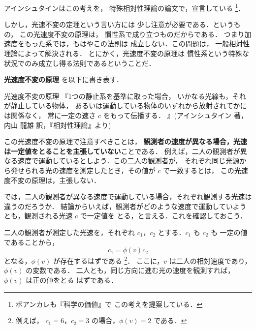             アインシュタインはこの考えを，
            特殊相対性理論の論文で，宣言している
                \footnote{
                    ポアンカレも『科学の価値』で
                    この考えを提案している．
                }．

            しかし，光速不変の定理という言い方には
            少し注意が必要である．というもの，
            この光速度不変の原理は，
            慣性系で成り立つものだからである．
            つまり加速度をもった系では，もはやこの法則は
            成立しない．この問題は，
            一般相対性理論によって解決される．
            とにかく，光速度不変の原理は
            慣性系という特殊な状況でのみ成立し得る法則であるということだ．



            \textbf{光速度不変の原理} を以下に書き表す．
            \begin{myshadebox}{光速度不変の原理}
                    『1つの静止系を基準に取った場合，
                    いかなる光線も，それが静止している物体，
                    あるいは運動している物体のいずれから放射されてかには関係なく，
                    常に一定の速さ $c$ をもって伝播する．
                    』(アインシュタイン 著，内山 龍雄 訳，『相対性理論』より)
            \end{myshadebox}

            この光速度不変の原理で注意すべきことは，
            \textbf{観測者の速度が異なる場合，光速は一定値をとることを主張していない}ことである．
            例えば，二人の観測者が異なる速度で運動しているとしよう．この二人の観測者が，
            それぞれ同じ光源から発せられる光の速度を測定したとき，その値が $c$ で一致するとは，
            この光速度不変の原理は，主張しない．

            では，二人の観測者が異なる速度で運動している場合，それぞれ観測する光速は違うのだろうか．
            結論からいえば，観測者がどのような速度で運動していようとも，観測される光速 $c$ で一定値を
            とる，と言える．これを確認しておこう．

            二人の観測者が測定した光速を，それぞれ $c_{1}$，$c_{2}$ とする．$c_{1}$ も $c_{2}$ も
            一定の値であることから，
                \begin{equation*}
                    c_{1}=\phi(v) c_{2}
                \end{equation*}
            となる，$\phi(v) $ が存在するはずである
                \footnote{
                        例えば， $c_{1}=6$，$c_{2}=3$ の場合，$\phi(v)  =2$ である．
                }．
            ここに，$v$ は二人の相対速度であり，$\phi(v)$ の変数である．
            二人とも，同じ方向に進む光の速度を観測すれば，$\phi(v)$ は正の値をとる
            はずである．

